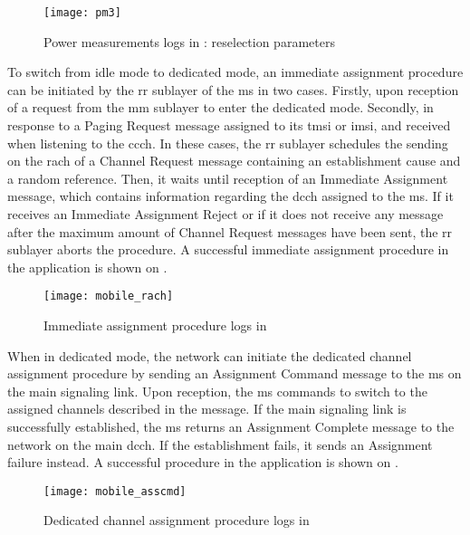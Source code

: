       \begin{figure}[p]
        \centering
        \texttt{[image: pm3]}
        \caption{Power measurements logs in : reselection
        parameters}
        \label{fig:pm3}
      \end{figure}

    To switch from idle mode to dedicated mode, an immediate assignment
    procedure can be initiated by the \gls{rr} sublayer of the \gls{ms}
    in two cases. Firstly, upon reception of a request from the \gls{mm}
    sublayer to enter the dedicated mode. Secondly, in response to a
    Paging Request message assigned to its \gls{tmsi} or \gls{imsi}, and
    received when listening to the \gls{ccch}. In these cases, the
    \gls{rr} sublayer schedules the sending on the \gls{rach} of a
    Channel Request message containing an establishment cause and a
    random reference. Then, it waits until reception of an Immediate
    Assignment message, which contains information regarding the
    \gls{dcch} assigned to the \gls{ms}. If it receives an Immediate
    Assignment Reject or if it does not receive any message after the
    maximum amount of Channel Request messages have been sent, the
    \gls{rr} sublayer aborts the procedure. A successful immediate
    assignment procedure in the  application is shown on
    .

      \begin{figure}[p]
        \centering
        \texttt{[image: mobile\_rach]}
        \caption{Immediate assignment procedure logs in }
        \label{fig:mobile_rach}
      \end{figure}

    When in dedicated mode, the network can initiate the dedicated
    channel assignment procedure by sending an Assignment Command
    message to the \gls{ms} on the main signaling link. Upon reception,
    the \gls{ms} commands to switch to the assigned channels described
    in the message. If the main signaling link is successfully
    established, the \gls{ms} returns an Assignment Complete message to
    the network on the main \gls{dcch}. If the establishment fails, it
    sends an Assignment failure instead. A successful procedure in the
     application is shown on .

      \begin{figure}[p]
        \centering
        \texttt{[image: mobile\_asscmd]}
        \caption{Dedicated channel assignment procedure logs in }
        \label{fig:mobile_asscmd}
      \end{figure}

